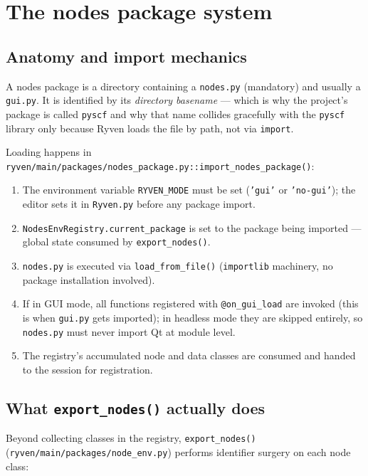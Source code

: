 \documentclass[10pt,a4paper]{article}
\newcommand{\code}[1]{\texttt{\small #1}}
\begin{document}
\section{The nodes package system}

\subsection{Anatomy and import mechanics}

A nodes package is a directory containing a \code{nodes.py} (mandatory) and usually a
\code{gui.py}. It is identified by its \emph{directory basename} --- which is why the
project's package is called \code{pyscf} and why that name collides gracefully with the
\code{pyscf} library only because Ryven loads the file by path, not via
\code{import}.

Loading happens in \code{ryven/main/packages/nodes\_package.py::import\_nodes\_package()}:

\begin{enumerate}
\item The environment variable \code{RYVEN\_MODE} must be set (\code{'gui'} or
      \code{'no-gui'}); the editor sets it in \code{Ryven.py} before any package import.
\item \code{NodesEnvRegistry.current\_package} is set to the package being imported ---
      global state consumed by \code{export\_nodes()}.
\item \code{nodes.py} is executed via \code{load\_from\_file()}
      (\code{importlib} machinery, no package installation involved).
\item If in GUI mode, all functions registered with \code{@on\_gui\_load} are invoked
      (this is when \code{gui.py} gets imported); in headless mode they are skipped
      entirely, so \code{nodes.py} must never import Qt at module level.
\item The registry's accumulated node and data classes are consumed and handed to the
      session for registration.
\end{enumerate}

\subsection{What \texttt{export\_nodes()} actually does}

Beyond collecting classes in the registry, \code{export\_nodes()}
(\code{ryven/main/packages/node\_env.py}) performs identifier surgery on each node
class:
\end{document}
